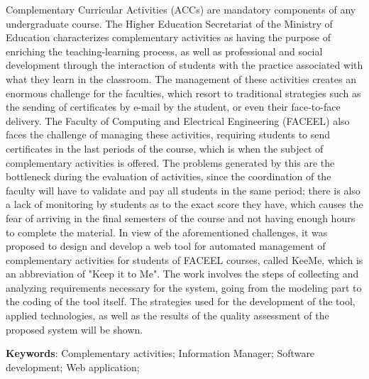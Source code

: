 
\begin{resumo}[ABSTRACT]
\begin{SingleSpacing}

Complementary Curricular Activities (ACCs) are mandatory components of any undergraduate course. The Higher Education Secretariat of the Ministry of Education characterizes complementary activities as having the purpose of enriching the teaching-learning process, as well as professional and social development through the interaction of students with the practice associated with what they learn in the classroom. The management of these activities creates an enormous challenge for the faculties, which resort to traditional strategies such as the sending of certificates by e-mail by the student, or even their face-to-face delivery. The Faculty of Computing and Electrical Engineering (FACEEL) also faces the challenge of managing these activities, requiring students to send certificates in the last periods of the course, which is when the subject of complementary activities is offered. The problems generated by this are the bottleneck during the evaluation of activities, since the coordination of the faculty will have to validate and pay all students in the same period; there is also a lack of monitoring by students as to the exact score they have, which causes the fear of arriving in the final semesters of the course and not having enough hours to complete the material. In view of the aforementioned challenges, it was proposed to design and develop a web tool for automated management of complementary activities for students of FACEEL courses, called KeeMe, which is an abbreviation of "Keep it to Me". The work involves the steps of collecting and analyzing requirements necessary for the system, going from the modeling part to the coding of the tool itself. The strategies used for the development of the tool, applied technologies, as well as the results of the quality assessment of the proposed system will be shown.


\end{SingleSpacing}

\textbf{Keywords}: Complementary activities; Information Manager; Software development; Web application;

\end{resumo}

